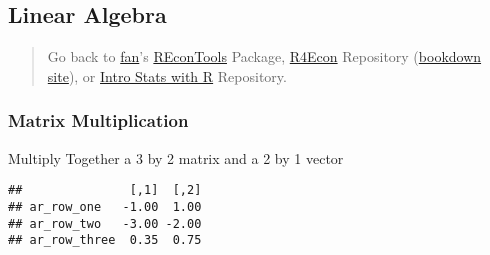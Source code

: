 \documentclass[
]{book}
\newenvironment{Shaded}{\begin{snugshade}}{\end{snugshade}}
\newcommand{\CommentTok}[1]{\textcolor[rgb]{0.56,0.35,0.01}{\textit{#1}}}
\newcommand{\DecValTok}[1]{\textcolor[rgb]{0.00,0.00,0.81}{#1}}
\newcommand{\FloatTok}[1]{\textcolor[rgb]{0.00,0.00,0.81}{#1}}
\newcommand{\KeywordTok}[1]{\textcolor[rgb]{0.13,0.29,0.53}{\textbf{#1}}}
\newcommand{\NormalTok}[1]{#1}
\newcommand{\OperatorTok}[1]{\textcolor[rgb]{0.81,0.36,0.00}{\textbf{#1}}}
\newcommand{\StringTok}[1]{\textcolor[rgb]{0.31,0.60,0.02}{#1}}
\begin{document}
\hypertarget{linear-algebra}{%
\subsection{Linear Algebra}\label{linear-algebra}}

\begin{quote}
Go back to \href{http://fanwangecon.github.io/}{fan}'s \href{https://fanwangecon.github.io/REconTools/}{REconTools} Package, \href{https://fanwangecon.github.io/R4Econ/}{R4Econ} Repository (\href{https://fanwangecon.github.io/R4Econ/bookdown}{bookdown site}), or \href{https://fanwangecon.github.io/Stat4Econ/}{Intro Stats with R} Repository.
\end{quote}

\hypertarget{matrix-multiplication}{%
\subsubsection{Matrix Multiplication}\label{matrix-multiplication}}

Multiply Together a 3 by 2 matrix and a 2 by 1 vector

\begin{Shaded}
\end{Shaded}

\begin{verbatim}
##               [,1]  [,2]
## ar_row_one   -1.00  1.00
## ar_row_two   -3.00 -2.00
## ar_row_three  0.35  0.75
\end{verbatim}
\end{document}
